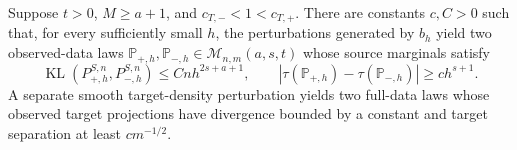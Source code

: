 Suppose \(t>0\), \(M\ge a+1\), and \(c_{T,-}<1<c_{T,+}\). There are constants \(c,C>0\) such that, for every sufficiently small \(h\), the perturbations generated by \(b_h\) yield two observed-data laws \(\mathbb P_{+,h},\mathbb P_{-,h}\in\mathcal M_{n,m}(a,s,t)\) whose source marginals satisfy \[\operatorname{KL}(P_{+,h}^{S,n},P_{-,h}^{S,n})\le Cnh^{2s+a+1},\qquad |\tau(\mathbb P_{+,h})-\tau(\mathbb P_{-,h})|\ge ch^{s+1}.\] A separate smooth target-density perturbation yields two full-data laws whose observed target projections have divergence bounded by a constant and target separation at least \(cm^{-1/2}\).